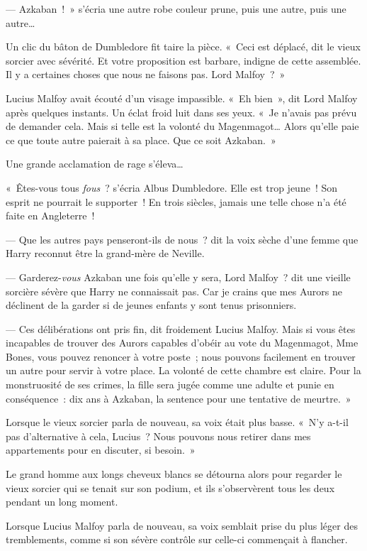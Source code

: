 --- Azkaban~!~»
s'écria une autre robe couleur prune, puis une autre, puis une autre…

Un clic du bâton de Dumbledore fit taire la pièce.
«~Ceci est déplacé, dit le vieux sorcier avec sévérité.
Et votre proposition est barbare, indigne de cette assemblée.
Il y a certaines choses que nous ne faisons pas.
Lord Malfoy~?~»

Lucius Malfoy avait écouté d'un visage impassible.
«~Eh bien~», dit Lord Malfoy après quelques instants.
Un éclat froid luit dans ses yeux.
«~Je n'avais pas prévu de demander cela.
Mais si telle est la volonté du Magenmagot…
Alors qu'elle paie ce que toute autre paierait à sa place.
Que ce soit Azkaban.~»

Une grande acclamation de rage s'éleva…

«~Êtes-vous tous \emph{fous}~? s'écria Albus Dumbledore.
Elle est trop jeune~!
Son esprit ne pourrait le supporter~!
En trois siècles, jamais une telle chose n'a été faite en Angleterre~!

--- Que les autres pays penseront-ils de nous~? dit la voix sèche d'une femme que Harry reconnut être la grand-mère de Neville.

--- Garderez-\emph{vous} Azkaban une fois qu'elle y sera, Lord Malfoy~? dit une vieille sorcière sévère que Harry ne connaissait pas.
Car je crains que mes Aurors ne déclinent de la garder si de jeunes enfants y sont tenus prisonniers.

--- Ces délibérations ont pris fin, dit froidement Lucius Malfoy.
Mais si vous êtes incapables de trouver des Aurors capables d'obéir au vote du Magenmagot, Mme Bones, vous pouvez renoncer à votre poste~; nous pouvons facilement en trouver un autre pour servir à votre place.
La volonté de cette chambre est claire.
Pour la monstruosité de ses crimes, la fille sera jugée comme une adulte et punie en conséquence~: dix ans à Azkaban, la sentence pour une tentative de meurtre.~»

Lorsque le vieux sorcier parla de nouveau, sa voix était plus basse.
«~N'y a-t-il pas d'alternative à cela, Lucius~?
Nous pouvons nous retirer dans mes appartements pour en discuter, si besoin.~»

Le grand homme aux longs cheveux blancs se détourna alors pour regarder le vieux sorcier qui se tenait sur son podium, et ils s'observèrent tous les deux pendant un long moment.

Lorsque Lucius Malfoy parla de nouveau, sa voix semblait prise du plus léger des tremblements, comme si son sévère contrôle sur celle-ci commençait à flancher.

